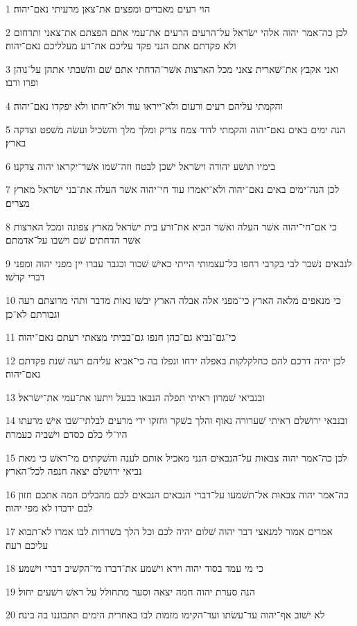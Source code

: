 \par 1 הוי רעים מאבדים ומפצים את־צאן מרעיתי נאם־יהוה׃
\par 2 לכן כה־אמר יהוה אלהי ישׂראל על־הרעים הרעים את־עמי אתם הפצתם את־צאני ותדחום ולא פקדתם אתם הנני פקד עליכם את־רע מעלליכם נאם־יהוה׃
\par 3 ואני אקבץ את־שׁארית צאני מכל הארצות אשׁר־הדחתי אתם שׁם והשׁבתי אתהן על־נוהן ופרו ורבו׃
\par 4 והקמתי עליהם רעים ורעום ולא־ייראו עוד ולא־יחתו ולא יפקדו נאם־יהוה׃
\par 5 הנה ימים באים נאם־יהוה והקמתי לדוד צמח צדיק ומלך מלך והשׂכיל ועשׂה משׁפט וצדקה בארץ׃
\par 6 בימיו תושׁע יהודה וישׂראל ישׁכן לבטח וזה־שׁמו אשׁר־יקראו יהוה צדקנו׃
\par 7 לכן הנה־ימים באים נאם־יהוה ולא־יאמרו עוד חי־יהוה אשׁר העלה את־בני ישׂראל מארץ מצרים׃
\par 8 כי אם־חי־יהוה אשׁר העלה ואשׁר הביא את־זרע בית ישׂראל מארץ צפונה ומכל הארצות אשׁר הדחתים שׁם וישׁבו על־אדמתם׃
\par 9 לנבאים נשׁבר לבי בקרבי רחפו כל־עצמותי הייתי כאישׁ שׁכור וכגבר עברו יין מפני יהוה ומפני דברי קדשׁו׃
\par 10 כי מנאפים מלאה הארץ כי־מפני אלה אבלה הארץ יבשׁו נאות מדבר ותהי מרוצתם רעה וגבורתם לא־כן׃
\par 11 כי־גם־נביא גם־כהן חנפו גם־בביתי מצאתי רעתם נאם־יהוה׃
\par 12 לכן יהיה דרכם להם כחלקלקות באפלה ידחו ונפלו בה כי־אביא עליהם רעה שׁנת פקדתם נאם־יהוה׃
\par 13 ובנביאי שׁמרון ראיתי תפלה הנבאו בבעל ויתעו את־עמי את־ישׂראל׃
\par 14 ובנבאי ירושׁלם ראיתי שׁערורה נאוף והלך בשׁקר וחזקו ידי מרעים לבלתי־שׁבו אישׁ מרעתו היו־לי כלם כסדם וישׁביה כעמרה׃
\par 15 לכן כה־אמר יהוה צבאות על־הנבאים הנני מאכיל אותם לענה והשׁקתים מי־ראשׁ כי מאת נביאי ירושׁלם יצאה חנפה לכל־הארץ׃
\par 16 כה־אמר יהוה צבאות אל־תשׁמעו על־דברי הנבאים הנבאים לכם מהבלים המה אתכם חזון לבם ידברו לא מפי יהוה׃
\par 17 אמרים אמור למנאצי דבר יהוה שׁלום יהיה לכם וכל הלך בשׁררות לבו אמרו לא־תבוא עליכם רעה׃
\par 18 כי מי עמד בסוד יהוה וירא וישׁמע את־דברו מי־הקשׁיב דברי וישׁמע׃
\par 19 הנה סערת יהוה חמה יצאה וסער מתחולל על ראשׁ רשׁעים יחול׃
\par 20 לא ישׁוב אף־יהוה עד־עשׂתו ועד־הקימו מזמות לבו באחרית הימים תתבוננו בה בינה׃

